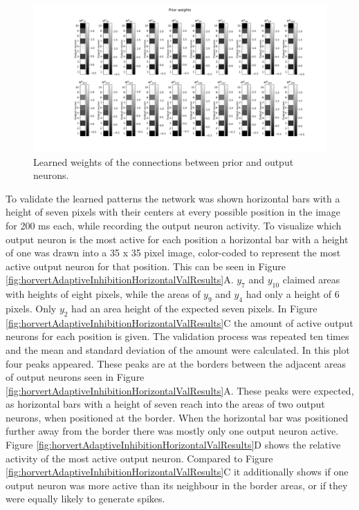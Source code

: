 \begin{figure}
  \includegraphics[width=\linewidth]{figures/horvertAdaptiveInh/priorWeights.png}
  \caption{ Learned weights of the connections between prior and output neurons. }
  \label{fig:horvertAdaptiveInhibitionpriorWeights}
\end{figure}

To validate the learned patterns the network was shown horizontal bars with a height of seven pixels with their centers at every possible position in the image for 200 ms each, while recording the output neuron activity. To visualize which output neuron is the most active for each position a horizontal bar with a height of one was drawn into a 35 x 35 pixel image, color-coded to represent the most active output neuron for that position. This can be seen in Figure \ref{fig:horvertAdaptiveInhibitionHorizontalValResults}A. $y_7$ and $y_10$ claimed areas with heights of eight pixels, while the areas of $y_9$ and $y_4$ had only a height of 6 pixels. Only $y_2$ had an area height of the expected seven pixels. In Figure \ref{fig:horvertAdaptiveInhibitionHorizontalValResults}C the amount of active output neurons for each position is given.  The validation process was repeated ten times and the mean and standard deviation of the amount were calculated. In this plot four peaks appeared. These peaks are at the borders between the adjacent areas of output neurons seen in Figure \ref{fig:horvertAdaptiveInhibitionHorizontalValResults}A. These peaks were expected, as horizontal bars with a height of seven reach into the areas of two output neurons, when positioned at the border. When the horizontal bar was positioned further away from the border there was mostly only one output neuron active. Figure \ref{fig:horvertAdaptiveInhibitionHorizontalValResults}D shows the relative activity of the most active output neuron. Compared to Figure \ref{fig:horvertAdaptiveInhibitionHorizontalValResults}C it additionally shows if one output neuron was more active than its neighbour in the border areas, or if they were equally likely to generate spikes.

